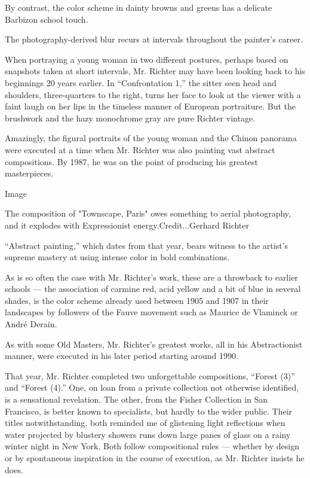 By contrast, the color scheme in dainty browns and greens has a delicate
Barbizon school touch.

The photography-derived blur recurs at intervals throughout the
painter's career.

When portraying a young woman in two different postures, perhaps based
on snapshots taken at short intervals, Mr. Richter may have been looking
back to his beginnings 20 years earlier. In ``Confrontation 1,'' the
sitter seen head and shoulders, three-quarters to the right, turns her
face to look at the viewer with a faint laugh on her lips in the
timeless manner of European portraiture. But the brushwork and the hazy
monochrome gray are pure Richter vintage.

Amazingly, the figural portraits of the young woman and the Chinon
panorama were executed at a time when Mr. Richter was also painting vast
abstract compositions. By 1987, he was on the point of producing his
greatest masterpieces.

Image

The composition of "Townscape, Paris" owes something to aerial
photography, and it explodes with Expressionist energy.Credit...Gerhard
Richter

``Abstract painting,'' which dates from that year, bears witness to the
artist's supreme mastery at using intense color in bold combinations.

As is so often the case with Mr. Richter's work, these are a throwback
to earlier schools --- the association of carmine red, acid yellow and a
bit of blue in several shades, is the color scheme already used between
1905 and 1907 in their landscapes by followers of the Fauve movement
such as Maurice de Vlaminck or André Derain.

As with some Old Masters, Mr. Richter's greatest works, all in his
Abstractionist manner, were executed in his later period starting around
1990.

That year, Mr. Richter completed two unforgettable compositions,
``Forest (3)'' and ``Forest (4).'' One, on loan from a private
collection not otherwise identified, is a sensational revelation. The
other, from the Fisher Collection in San Francisco, is better known to
specialists, but hardly to the wider public. Their titles
notwithstanding, both reminded me of glistening light reflections when
water projected by blustery showers runs down large panes of glass on a
rainy winter night in New York. Both follow compositional rules ---
whether by design or by spontaneous inspiration in the course of
execution, as Mr. Richter insists he does.

